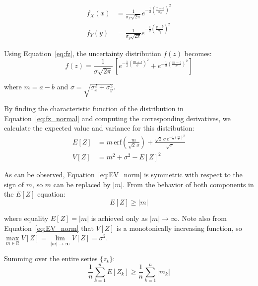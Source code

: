 \documentclass[12pt,a4paper]{article}
\theoremstyle{definition}
\begin{document}
\begin{equation}
	\begin{aligned}
		f_X(x) &= \frac{1}{\sigma_x\sqrt{2\pi}}e^{-\frac{1}{2} \left(\frac{x-a}{\sigma_x}\right)^2}\\
		f_Y(y) &= \frac{1}{\sigma_y\sqrt{2\pi}}e^{-\frac{1}{2} \left(\frac{y-b}{\sigma_y}\right)^2}
	\end{aligned}
	\label{eq:fxfy_norm}
\end{equation}

Using Equation~\ref{eq:fz}, the uncertainty distribution $f(z)$ becomes:
\begin{equation}
	f(z) = \frac{1}{\sigma\sqrt{2\pi}}\,\left[e^{-\frac{1}{2} \left(\frac{m+z}{\sigma}\right)^2} + e^{-\frac{1}{2} \left(\frac{m-z}{\sigma}\right)^2}\right]
	\label{eq:fz_normal}
\end{equation}

where $m = a - b$ and $\sigma = \sqrt{\sigma_x^2 + \sigma_y^2}$.

By finding the characteristic function of the distribution in Equation~\ref{eq:fz_normal} and computing the corresponding derivatives, we calculate the expected value and variance for this distribution:
\begin{equation}
	\begin{aligned}
		E[Z] &= m\,\mathrm{erf}\left(\frac{m}{\sqrt{2}\,\sigma}\right)+\frac{\sqrt{2}\,\sigma\,e^{-\frac{1}{2}\left(\frac{m}{\sigma}\right)^2}}{\sqrt{\pi}}\\
		V[Z] &=  m^2+\sigma^2-E[Z]^2
	\end{aligned}
	\label{eq:EV_norm}
\end{equation}

As can be observed, Equation~\ref{eq:EV_norm} is symmetric with respect to the sign of $m$, so $m$ can be replaced by $|m|$. From the behavior of both components in the $E[Z]$ equation:
\begin{equation}
	E[Z] \geq |m|
	\label{eq:EZ_geq_m_norm}
\end{equation}

where equality $E[Z] = |m|$ is achieved only as $|m|\to\infty$. Note also from Equation~\ref{eq:EV_norm} that $V[Z]$ is a monotonically increasing function, so $\max\limits_{m\in\mathbb{R}} V[Z] = \lim\limits_{|m|\to \infty} V[Z] = \sigma^2$.

Summing over the entire series $\{z_k\}$:
\begin{equation}
	\frac{1}{n} \sum\limits_{k=1}^{n} E[Z_k] \geq \frac{1}{n}\sum\limits_{k=1}^{n} |m_k|
\end{equation}
\end{document}
